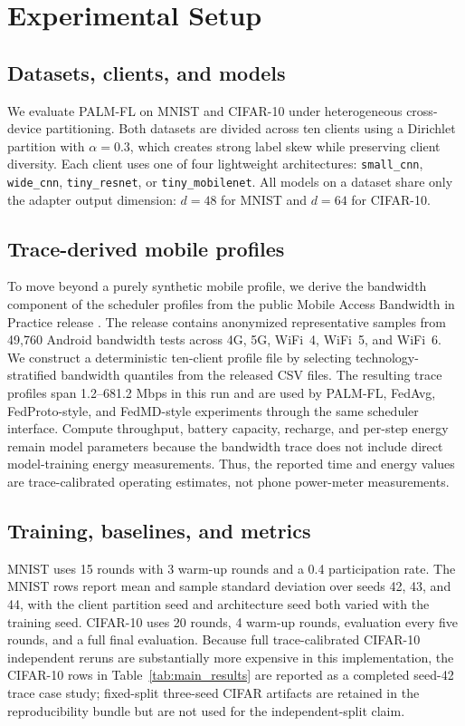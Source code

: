 \documentclass[10pt,journal]{IEEEtran}
\begin{document}
\section{Experimental Setup}
\subsection{Datasets, clients, and models}
We evaluate PALM-FL on MNIST and CIFAR-10 \cite{mnist,cifar10} under heterogeneous cross-device partitioning. Both datasets are divided across ten clients using a Dirichlet partition with $\alpha=0.3$, which creates strong label skew while preserving client diversity. Each client uses one of four lightweight architectures: \texttt{small\_cnn}, \texttt{wide\_cnn}, \texttt{tiny\_resnet}, or \texttt{tiny\_mobilenet}. All models on a dataset share only the adapter output dimension: $d=48$ for MNIST and $d=64$ for CIFAR-10.

\subsection{Trace-derived mobile profiles}
To move beyond a purely synthetic mobile profile, we derive the bandwidth component of the scheduler profiles from the public Mobile Access Bandwidth in Practice release \cite{mobilebandwidth}. The release contains anonymized representative samples from 49,760 Android bandwidth tests across 4G, 5G, WiFi~4, WiFi~5, and WiFi~6. We construct a deterministic ten-client profile file by selecting technology-stratified bandwidth quantiles from the released CSV files. The resulting trace profiles span 1.2--681.2 Mbps in this run and are used by PALM-FL, FedAvg, FedProto-style, and FedMD-style experiments through the same scheduler interface. Compute throughput, battery capacity, recharge, and per-step energy remain model parameters because the bandwidth trace does not include direct model-training energy measurements. Thus, the reported time and energy values are trace-calibrated operating estimates, not phone power-meter measurements.

\subsection{Training, baselines, and metrics}
MNIST uses 15 rounds with 3 warm-up rounds and a 0.4 participation rate. The MNIST rows report mean and sample standard deviation over seeds 42, 43, and 44, with the client partition seed and architecture seed both varied with the training seed. CIFAR-10 uses 20 rounds, 4 warm-up rounds, evaluation every five rounds, and a full final evaluation. Because full trace-calibrated CIFAR-10 independent reruns are substantially more expensive in this implementation, the CIFAR-10 rows in Table~\ref{tab:main_results} are reported as a completed seed-42 trace case study; fixed-split three-seed CIFAR artifacts are retained in the reproducibility bundle but are not used for the independent-split claim.
\end{document}
